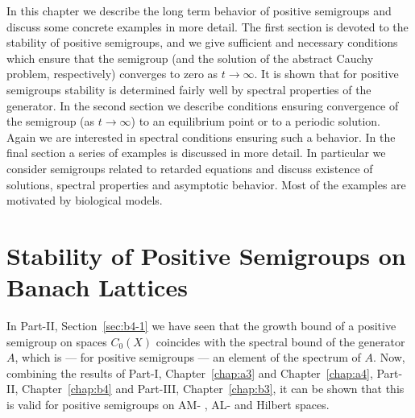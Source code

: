 \setcounter{section}{0}
\label{chap:c4}%
\thispagestyle{empty}
In this chapter we describe the long term behavior of positive semigroups and discuss some concrete examples in more detail.
The first section is devoted to the stability of positive semigroups, and we give sufficient and necessary conditions which ensure that the semigroup (and the solution of the abstract Cauchy problem, respectively) converges to zero as $t \to \infty$.
It is shown that for positive semigroups stability is determined fairly well by spectral properties of the generator.
In the second section we describe conditions ensuring convergence of the semigroup (as $t \to \infty$) to an equilibrium point or to a periodic solution.
Again we are interested in spectral conditions ensuring such a behavior.
In the final section a series of examples is discussed in more detail.
In particular we consider semigroups related to retarded equations and discuss existence of solutions, spectral properties and asymptotic behavior.
Most of the examples are motivated by biological models.

\section{Stability of Positive Semigroups on Banach Lattices}\label{sec:c4-1} 
\hspace{1cm}{\Large by Günther Greiner and Frank Neubrander}
\vspace{.5cm}
\newline
In Part-II, Section~\ref{sec:b4-1} we have seen that the growth bound of a positive semigroup on spaces $C_{0}(X)$ coincides with the spectral bound of the generator $A$, which is --- for positive semigroups --- an element of the spectrum of\/ $A$.
Now, combining the results of Part-I, Chapter~\ref{chap:a3} and Chapter~\ref{chap:a4},  
Part-II, Chapter~\ref{chap:b4} and Part-III, Chapter~\ref{chap:b3},  it can be shown that this is valid for positive semigroups on AM- , AL- and Hilbert spaces.

